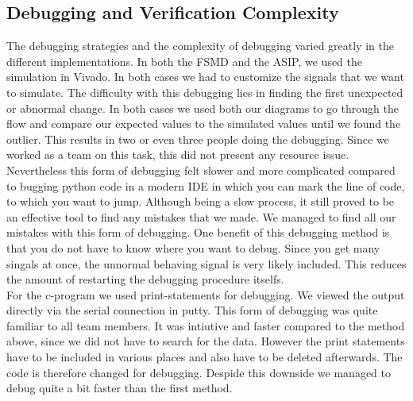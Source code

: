 \documentclass[conference]{IEEEtran}
\begin{document}
\subsection{Debugging and Verification Complexity}
The debugging strategies and the complexity of debugging varied greatly in the different implementations. In both the FSMD and the ASIP, we used the simulation in Vivado. In both cases we had to customize the signals that we want to simulate. The difficulty with this debugging lies in finding the first unexpected or abnormal change. In both cases we used both our diagrams to go through the flow and compare our expected values to the simulated values until we found the outlier. This results in two or even three people doing the debugging. Since we worked as a team on this task, this did not present any resource issue. Nevertheless this form of debugging felt slower and more complicated compared to bugging python code in a modern IDE in which you can mark the line of code, to which you want to jump. Although being a slow process, it still proved to be an effective tool to find any mistakes that we made. We managed to find all our mistakes with this form of debugging. One benefit of this debugging method is that you do not have to know where you want to debug. Since you get many singals at once, the unnormal behaving signal is very likely included. This reduces the amount of restarting the debugging procedure itselfs. \\
For the c-program we used print-statements for debugging. We viewed the output directly via the serial connection in putty. This form of debugging was quite familiar to all team members. It was intiutive and faster compared to the method above, since we did not have to search for the data. However the print statements have to be included in various places and also have to be deleted afterwards. The code is therefore changed for debugging. Despide this downside we managed to debug quite a bit faster than the first method. \\
\end{document}
